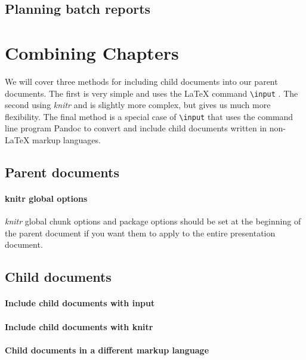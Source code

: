 \subsection{Planning batch reports}

\section{Combining Chapters}

We will cover three methods for including child documents into our parent documents. The first is very simple and uses the LaTeX command \texttt{\textbackslash{}input} . The second using {\emph{knitr}} and is slightly more complex, but gives us much more flexibility. The final method is a special case of \texttt{\textbackslash{}input} that uses the command line program Pandoc  to convert and include child documents written in non-LaTeX markup languages. 

\subsection{Parent documents}

\paragraph{knitr global options}
{\emph{knitr}} global chunk options and package options should be set at the beginning of the parent document if you want them to apply to the entire presentation document. 

\subsection{Child documents}

\paragraph{Include child documents with input}

\paragraph{Include child documents with knitr}

\paragraph{Child documents in a different markup language}

